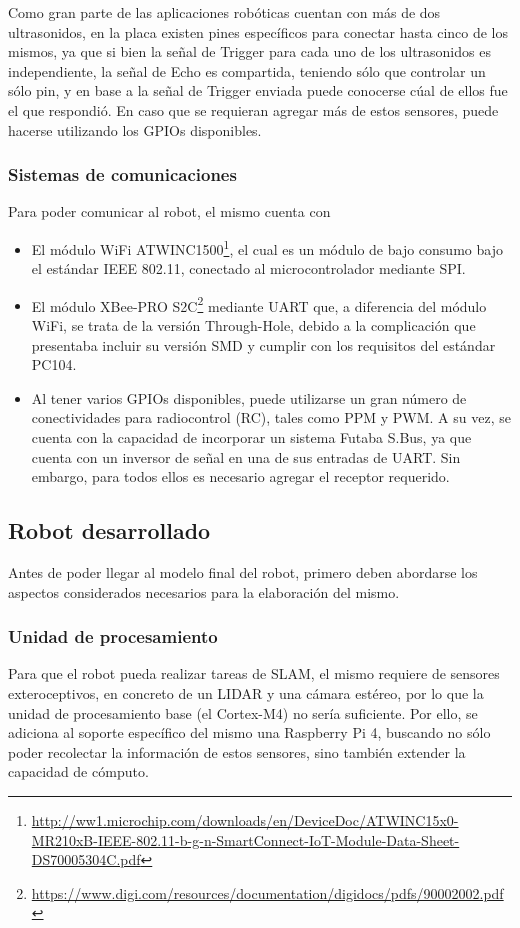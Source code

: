 Como gran parte de las aplicaciones robóticas cuentan con más de dos ultrasonidos, en la placa existen pines específicos para conectar hasta cinco de los mismos, ya que si bien la señal de Trigger para cada uno de los ultrasonidos es independiente, la señal de Echo es compartida, teniendo sólo que controlar un sólo pin, y en base a la señal de Trigger enviada puede conocerse cúal de ellos fue el que respondió. En caso que se requieran agregar más de estos sensores, puede hacerse utilizando los GPIOs disponibles.
\subsubsection{Sistemas de comunicaciones}
Para poder comunicar al robot, el mismo cuenta con
\begin{itemize}
    \item El módulo WiFi ATWINC1500\footnote{\url{http://ww1.microchip.com/downloads/en/DeviceDoc/ATWINC15x0-MR210xB-IEEE-802.11-b-g-n-SmartConnect-IoT-Module-Data-Sheet-DS70005304C.pdf}}, el cual es un módulo de bajo consumo bajo el estándar IEEE 802.11, conectado al microcontrolador mediante SPI.
    \item El módulo XBee-PRO S2C\footnote{\url{https://www.digi.com/resources/documentation/digidocs/pdfs/90002002.pdf}} mediante UART que, a diferencia del módulo WiFi, se trata de la versión Through-Hole, debido a la complicación que presentaba incluir su versión SMD y cumplir con los requisitos del estándar PC104.
    \item Al tener varios GPIOs disponibles, puede utilizarse un gran número de conectividades para radiocontrol (RC), tales como PPM y PWM. A su vez, se cuenta con la capacidad de incorporar un sistema Futaba S.Bus, ya que cuenta con un inversor de señal en una de sus entradas de UART. Sin embargo, para todos ellos es necesario agregar el receptor requerido.
\end{itemize}


\subsection{Robot desarrollado}
Antes de poder llegar al modelo final del robot, primero deben abordarse los aspectos considerados necesarios para la elaboración del mismo.

\subsubsection{Unidad de procesamiento}
Para que el robot pueda realizar tareas de SLAM, el mismo requiere de sensores exteroceptivos, en concreto de un LIDAR y una cámara estéreo, por lo que la unidad de procesamiento base (el Cortex-M4) no sería suficiente. Por ello, se adiciona al soporte específico del mismo una Raspberry Pi 4, buscando no sólo poder recolectar la información de estos sensores, sino también extender la capacidad de cómputo.

